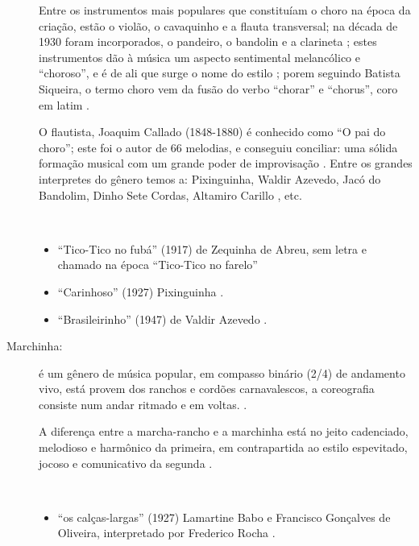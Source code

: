 \begin{description}
Entre os instrumentos mais populares que constituíam o choro na época da criação, 
estão o violão, o cavaquinho e a flauta transversal;
na década de 1930 foram incorporados, o pandeiro, o bandolin e a clarineta \cite[pp. 64]{reinato2010musica} \cite[pp. 79]{dourado2004dicionario} \cite[pp. 132]{perna2002samba};
estes instrumentos dão à música um aspecto sentimental melancólico e ``choroso'', e
é de ali que surge o nome do estilo \cite[pp. 132]{perna2002samba};
porem seguindo Batista Siqueira, 
o termo choro vem da fusão do verbo ``chorar'' e ``chorus'', coro em latim \cite[pp. 13]{diniz2003almanaque}.

O flautista, Joaquim Callado (1848-1880) é conhecido como ``O pai do choro'';
este foi o autor de 66 melodias, e conseguiu conciliar: 
uma sólida formação musical com um grande poder de improvisação  \cite[pp. 64]{reinato2010musica}.
Entre os grandes interpretes do gênero temos a:
Pixinguinha, Waldir Azevedo, Jacó do Bandolim, Dinho Sete Cordas, Altamiro Carillo \cite[pp. 79]{dourado2004dicionario}, etc.

\begin{example} ~

\begin{itemize}
\item ``Tico-Tico no fubá'' (1917) de Zequinha de Abreu, sem letra e chamado na época ``Tico-Tico no farelo'' \cite[pp. 6]{marcondes1998enciclopedia} \cite[pp. 39,91]{diniz2003almanaque}
\item ``Carinhoso'' (1927) Pixinguinha   \cite[pp. 133]{perna2002samba}.
\item ``Brasileirinho'' (1947) de Valdir Azevedo  \cite[pp. 133]{perna2002samba}.

\end{itemize}
\end{example}

\item[Marchinha:] 
é um gênero de música popular, em compasso binário (2/4) de andamento vivo, 
está provem dos ranchos e cordões carnavalescos, a coreografia consiste num andar ritmado e em voltas. \cite[pp. 65]{reinato2010musica}.

A diferença entre a marcha-rancho e  a marchinha está no jeito cadenciado, 
melodioso e harmônico da primeira, em contrapartida ao estilo espevitado,
jocoso e comunicativo da segunda \cite[pp. 87]{diniz2008almanaque}.
\begin{example} ~

\begin{itemize}
\item ``os calças-largas'' (1927) Lamartine Babo e Francisco Gonçalves de Oliveira,
interpretado por Frederico Rocha \cite[pp. 91]{diniz2008almanaque}.
\end{itemize}
\end{example}


\end{description}

